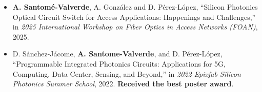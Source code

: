 \begin{itemize}

  \item \textbf{A. Santomé-Valverde}, A. González and D. Pérez-López, “Silicon Photonics Optical 
  Circuit Switch for Access Applications: Happenings and Challenges,” in 
  \textit{2025 International Workshop on Fiber Optics in Access Networks (FOAN)}, 2025.

  \item D. Sánchez-Jácome, \textbf{A. Santome-Valverde}, and D. Pérez-López, “Programmable 
  Integrated Photonics Circuits: Applications for 5G, Computing, Data Center, Sensing, and 
  Beyond,” in \textit{2022 Epixfab Silicon Photonics Summer School}, 2022. 
  \textbf{Received the best poster award}.

\end{itemize}